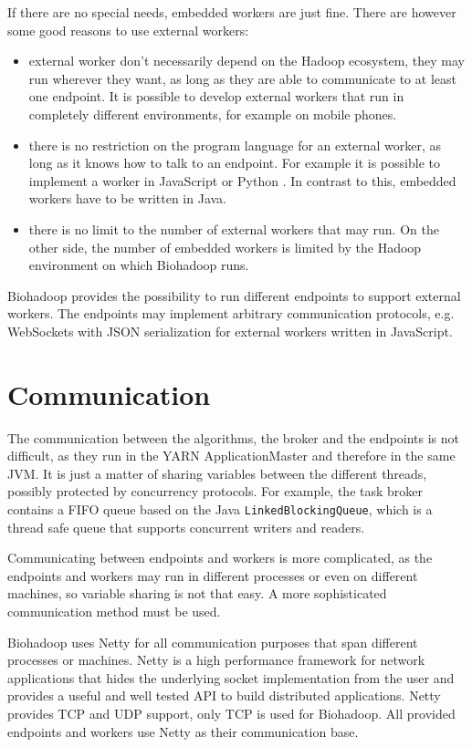If there are no special needs, embedded workers are just fine. There are however some good reasons to use external workers:

\begin{itemize}
  \item external worker don't necessarily depend on the Hadoop ecosystem, they may run wherever they want, as long as they are able to communicate to at least one endpoint. It is possible to develop external workers that run in completely different environments, for example on mobile phones.
  \item there is no restriction on the program language for an external worker, as long as it knows how to talk to an endpoint. For example it is possible to implement a worker in JavaScript \cite{bioworker-browser} or Python \cite{bioworker-python}. In contrast to this, embedded workers have to be written in Java.
  \item there is no limit to the number of external workers that may run. On the other side, the number of embedded workers is limited by the Hadoop environment on which Biohadoop runs.
\end{itemize}

Biohadoop provides the possibility to run different endpoints to support external workers. The endpoints may implement arbitrary communication protocols, e.g. WebSockets with JSON serialization for external workers written in JavaScript.

\section{Communication}
\label{chap:impl:communication}
The communication between the algorithms, the broker and the endpoints is not difficult, as they run in the YARN ApplicationMaster and therefore in the same JVM. It is just a matter of sharing variables between the different threads, possibly protected by concurrency protocols. For example, the task broker contains a FIFO queue based on the Java \texttt{LinkedBlockingQueue}, which is a thread safe queue that supports concurrent writers and readers.
  
Communicating between endpoints and workers is more complicated, as the endpoints and workers may run in different processes or even on different machines, so variable sharing is not that easy. A more sophisticated communication method must be used.

Biohadoop uses Netty \cite{netty} for all communication purposes that span different processes or machines. Netty is a high performance framework for network applications that hides the underlying socket implementation from the user and provides a useful and well tested API to build distributed applications. Netty provides TCP and UDP support, only TCP is used for Biohadoop. All provided endpoints and workers use Netty as their communication base.


